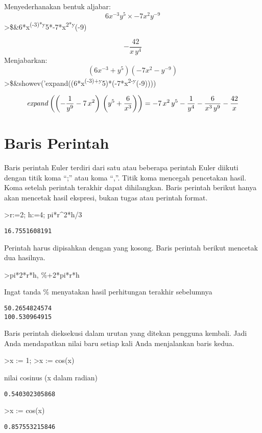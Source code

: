 \documentclass[
]{book}
\begin{document}
Menyederhanakan bentuk aljabar: \[6x^{-3}y^5\times -7x^2y^{-9}\]\textgreater\$\&6*x\textsuperscript{(-3)*y}5*-7*x\textsuperscript{2*y}(-9)

\[-\frac{42}{x\,y^4}\]Menjabarkan: \[(6x^{-3}+y^5)(-7x^2-y^{-9})\] \textgreater\$\&showev('expand((6*x\textsuperscript{(-3)+y}5)*(-7*x\textsuperscript{2-y}(-9))))

\[{\it expand}\left(\left(-\frac{1}{y^9}-7\,x^2\right)\,\left(y^5+  \frac{6}{x^3}\right)\right)=-7\,x^2\,y^5-\frac{1}{y^4}-\frac{6}{x^3  \,y^9}-\frac{42}{x}\]

\section{Baris Perintah}\label{baris-perintah}

Baris perintah Euler terdiri dari satu atau beberapa perintah Euler diikuti dengan titik koma ``;'' atau koma ``,''. Titik koma mencegah pencetakan hasil. Koma setelah perintah terakhir dapat dihilangkan. Baris perintah berikut hanya akan mencetak hasil ekspresi, bukan tugas atau perintah format.

\textgreater r:=2; h:=4; pi*r\^{}2*h/3

\begin{verbatim}
16.7551608191
\end{verbatim}

Perintah harus dipisahkan dengan yang kosong. Baris perintah berikut mencetak dua hasilnya.

\textgreater pi*2*r*h, \%+2*pi*r*h

Ingat tanda \% menyatakan hasil perhitungan terakhir sebelumnya

\begin{verbatim}
50.2654824574
100.530964915
\end{verbatim}

Baris perintah dieksekusi dalam urutan yang ditekan pengguna kembali. Jadi Anda mendapatkan nilai baru setiap kali Anda menjalankan baris kedua.

\textgreater x := 1; \textgreater x := cos(x)

nilai cosinus (x dalam radian)

\begin{verbatim}
0.540302305868
\end{verbatim}

\textgreater x := cos(x)

\begin{verbatim}
0.857553215846
\end{verbatim}
\end{document}
